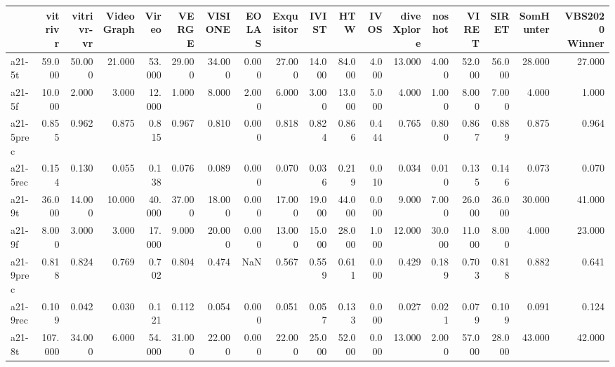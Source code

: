 \begin{tabular}{lrrrrrrrrrrrrrrrrr}
\toprule
{} &  vitrivr &  vitrivr-vr &  VideoGraph &    Vireo &    VERGE &  VISIONE &   EOLAS &  Exquisitor &   IVIST &     HTW &    IVOS &  diveXplore &   noshot &    VIRET &    SIRET &  SomHunter &  VBS2020 Winner \\
\midrule
a21-5t     &   59.000 &      50.000 &      21.000 &   53.000 &   29.000 &   34.000 &   0.000 &      27.000 &  14.000 &  84.000 &   4.000 &      13.000 &    4.000 &   52.000 &   56.000 &     28.000 &          27.000 \\
a21-5f     &   10.000 &       2.000 &       3.000 &   12.000 &    1.000 &    8.000 &   2.000 &       6.000 &   3.000 &  13.000 &   5.000 &       4.000 &    1.000 &    8.000 &    7.000 &      4.000 &           1.000 \\
a21-5prec  &    0.855 &       0.962 &       0.875 &    0.815 &    0.967 &    0.810 &   0.000 &       0.818 &   0.824 &   0.866 &   0.444 &       0.765 &    0.800 &    0.867 &    0.889 &      0.875 &           0.964 \\
a21-5rec   &    0.154 &       0.130 &       0.055 &    0.138 &    0.076 &    0.089 &   0.000 &       0.070 &   0.036 &   0.219 &   0.010 &       0.034 &    0.010 &    0.135 &    0.146 &      0.073 &           0.070 \\
a21-9t     &   36.000 &      14.000 &      10.000 &   40.000 &   37.000 &   18.000 &   0.000 &      17.000 &  19.000 &  44.000 &   0.000 &       9.000 &    7.000 &   26.000 &   36.000 &     30.000 &          41.000 \\
a21-9f     &    8.000 &       3.000 &       3.000 &   17.000 &    9.000 &   20.000 &   0.000 &      13.000 &  15.000 &  28.000 &   1.000 &      12.000 &   30.000 &   11.000 &    8.000 &      4.000 &          23.000 \\
a21-9prec  &    0.818 &       0.824 &       0.769 &    0.702 &    0.804 &    0.474 &     NaN &       0.567 &   0.559 &   0.611 &   0.000 &       0.429 &    0.189 &    0.703 &    0.818 &      0.882 &           0.641 \\
a21-9rec   &    0.109 &       0.042 &       0.030 &    0.121 &    0.112 &    0.054 &   0.000 &       0.051 &   0.057 &   0.133 &   0.000 &       0.027 &    0.021 &    0.079 &    0.109 &      0.091 &           0.124 \\
a21-8t     &  107.000 &      34.000 &       6.000 &   54.000 &   31.000 &   22.000 &   0.000 &      22.000 &  25.000 &  52.000 &   0.000 &      13.000 &    2.000 &   57.000 &   28.000 &     43.000 &          42.000 \\

\end{tabular}
